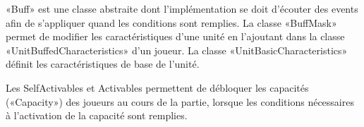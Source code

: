 «Buff» est une classe abstraite dont l'implémentation se doit d'écouter des events
afin de s'appliquer quand les conditions sont remplies.
La classe «BuffMask» permet de modifier les caractéristiques d'une unité en
l'ajoutant dans la classe «UnitBuffedCharacteristics» d'un joueur.
La classe «UnitBasicCharacteristics» définit les caractéristiques de base de l'unité.

Les SelfActivables et Activables permettent de débloquer les capacités («Capacity») des
joueurs au cours de la partie, lorsque les conditions nécessaires à l'activation
de la capacité sont remplies.

